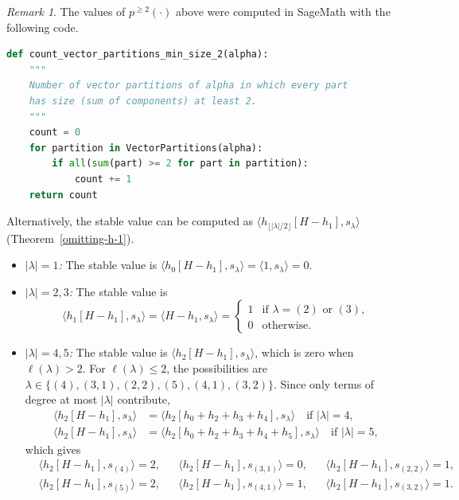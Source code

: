 \documentclass[reqno]{amsart}
\theoremstyle{plain}
\theoremstyle{definition}
\theoremstyle{remark}
\newtheorem{remark}[theorem]{Remark}
\theoremstyle{plain}
\begin{document}
\begin{remark}
The values of $p^{\ge 2}(\cdot)$ above were computed in SageMath with the
following code.
\end{remark}
\begin{lstlisting}[language=Python]
def count_vector_partitions_min_size_2(alpha):
    """
    Number of vector partitions of alpha in which every part
    has size (sum of components) at least 2.
    """
    count = 0
    for partition in VectorPartitions(alpha):
        if all(sum(part) >= 2 for part in partition):
            count += 1
    return count
\end{lstlisting}

Alternatively, the stable value can be computed as
$\langle h_{\lfloor|\lambda|/2\rfloor}[H-h_1],s_\lambda\rangle$ (Theorem~\ref{omitting-h-1}).
\begin{itemize}
    \item \emph{$|\lambda|=1$:} The stable value is $\langle h_0[H-h_1],s_\lambda\rangle=\langle 1,s_\lambda\rangle=0$.
    \item \emph{$|\lambda|=2,3$:} The stable value is
    $$\langle h_1[H-h_1],s_\lambda\rangle=\langle H-h_1,s_\lambda\rangle
    =\begin{cases}
        1 & \text{if } \lambda=(2) \text{ or } (3),\\
        0 & \text{otherwise.}
    \end{cases}$$
    \item \emph{$|\lambda|=4,5$:} The stable value is
    $\langle h_2[H-h_1],s_\lambda\rangle$, which is zero when $\ell(\lambda)>2$.
    For $\ell(\lambda)\le 2$, the possibilities are
    $\lambda\in\{(4),(3,1),(2,2),(5),(4,1),(3,2)\}$. Since only terms of degree
    at most $|\lambda|$ contribute,
    \begin{align*}
    \langle h_2[H-h_1], s_\lambda\rangle
      &= \langle h_2[h_0+h_2+h_3+h_4], s_\lambda\rangle \quad\text{if } |\lambda| = 4,\\
    \langle h_2[H-h_1], s_\lambda\rangle
      &= \langle h_2[h_0+h_2+h_3+h_4+h_5], s_\lambda\rangle \quad\text{if } |\lambda| = 5,
    \end{align*}
    which gives
    \begin{align*}
    &\langle h_2[H-h_1], s_{(4)}\rangle=2, && \langle h_2[H-h_1], s_{(3,1)}\rangle=0, && \langle h_2[H-h_1], s_{(2,2)}\rangle=1,\\
    &\langle h_2[H-h_1], s_{(5)}\rangle=2, && \langle h_2[H-h_1], s_{(4,1)}\rangle=1, && \langle h_2[H-h_1], s_{(3,2)}\rangle=1.
    \end{align*}
\end{itemize}
\end{document}
